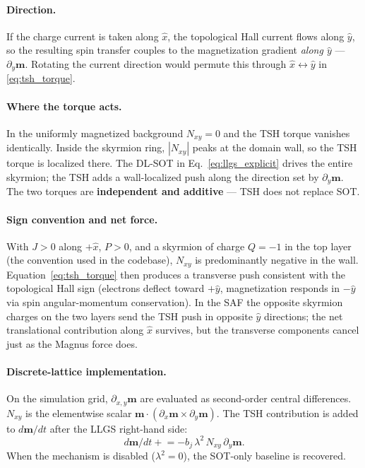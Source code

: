 \documentclass[11pt,a4paper]{article}
\newcommand{\mb}[1]{\mathbf{#1}}
\begin{document}
\paragraph{Direction.}
If the charge current is taken along $\hat{x}$, the topological Hall current
flows along $\hat{y}$, so the resulting spin transfer couples
to the magnetization gradient \emph{along $\hat{y}$} ---
$\partial_y\mb{m}$.  Rotating the current direction would
permute this through $\hat{x} \leftrightarrow \hat{y}$ in
\eqref{eq:tsh_torque}.

\paragraph{Where the torque acts.}
In the uniformly magnetized background $N_{xy} = 0$ and the
TSH torque vanishes identically.  Inside the skyrmion ring,
$|N_{xy}|$ peaks at the domain wall, so the TSH torque is
localized there.  The DL-SOT in
Eq.~\eqref{eq:llgs_explicit} drives the entire skyrmion;
the TSH adds a wall-localized push along the
direction set by $\partial_y \mb{m}$.  The two torques are
\textbf{independent and additive} --- TSH does not replace SOT.

\paragraph{Sign convention and net force.}
With $J > 0$ along $+\hat{x}$, $P > 0$, and a skyrmion of
charge $Q = -1$ in the top layer (the convention used in the
codebase), $N_{xy}$ is predominantly negative in the wall.
Equation~\eqref{eq:tsh_torque} then produces a transverse
push consistent with the topological Hall sign (electrons
deflect toward $+\hat{y}$, magnetization responds in $-\hat{y}$
via spin angular-momentum conservation).  In the SAF the
opposite skyrmion charges on the two layers send the TSH push
in opposite $\hat{y}$ directions; the net translational
contribution along $\hat{x}$ survives, but the transverse
components cancel just as the Magnus force does.

\paragraph{Discrete-lattice implementation.}
On the simulation grid, $\partial_{x,y}\mb{m}$ are evaluated as
second-order central differences.  $N_{xy}$ is the elementwise scalar
$\mb{m}\cdot(\partial_x\mb{m}\times \partial_y\mb{m})$.  The
TSH contribution is added to $d\mb{m}/dt$ after the LLGS
right-hand side:
%
\begin{equation*}
d\mb{m}/dt \mathrel{+}= -b_j\,\lambda^2\,
    N_{xy}\,\partial_y\mb{m}.
\end{equation*}
%
When the mechanism is disabled ($\lambda^2 = 0$), 
the SOT-only baseline is recovered.
\end{document}
